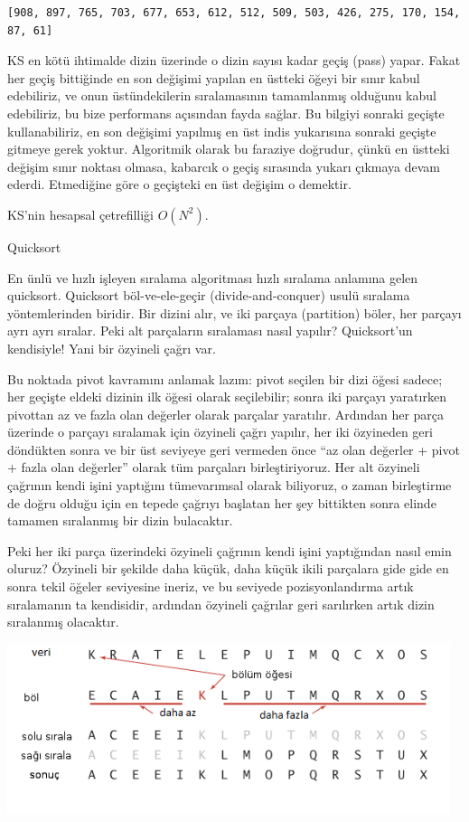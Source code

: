 \documentclass[12pt,fleqn]{article}\usepackage{../../common}
\begin{document}
\begin{verbatim}
[908, 897, 765, 703, 677, 653, 612, 512, 509, 503, 426, 275, 170, 154, 87, 61]
\end{verbatim}

KS en kötü ihtimalde dizin üzerinde o dizin sayısı kadar geçiş (pass)
yapar. Fakat her geçiş bittiğinde en son değişimi yapılan en üstteki öğeyi bir
sınır kabul edebiliriz, ve onun üstündekilerin sıralamasının tamamlanmış
olduğunu kabul edebiliriz, bu bize performans açısından fayda sağlar. Bu bilgiyi
sonraki geçişte kullanabiliriz, en son değişimi yapılmış en üst indis yukarısına
sonraki geçişte gitmeye gerek yoktur. Algoritmik olarak bu faraziye doğrudur,
çünkü en üstteki değişim sınır noktası olmasa, kabarcık o geçiş sırasında yukarı
çıkmaya devam ederdi.  Etmediğine göre o geçişteki en üst değişim o demektir.

KS'nin hesapsal çetrefilliği $O(N^2)$.

Quicksort

En ünlü ve hızlı işleyen sıralama algoritması hızlı sıralama anlamına gelen
quicksort. Quicksort böl-ve-ele-geçir (divide-and-conquer) usulü sıralama
yöntemlerinden biridir. Bir dizini alır, ve iki parçaya (partition) böler,
her parçayı ayrı ayrı sıralar. Peki alt parçaların sıralaması nasıl
yapılır? Quicksort'un kendisiyle! Yani bir özyineli çağrı var.

Bu noktada pivot kavramını anlamak lazım: pivot seçilen bir dizi öğesi sadece;
her geçişte eldeki dizinin ilk öğesi olarak seçilebilir; sonra iki parçayı
yaratırken pivottan az ve fazla olan değerler olarak parçalar
yaratılır. Ardından her parça üzerinde o parçayı sıralamak için özyineli çağrı
yapılır, her iki özyineden geri döndükten sonra ve bir üst seviyeye geri
vermeden önce ``az olan değerler + pivot + fazla olan değerler'' olarak tüm
parçaları birleştiriyoruz. Her alt özyineli çağrının kendi işini yaptığını
tümevarımsal olarak biliyoruz, o zaman birleştirme de doğru olduğu için en
tepede çağrıyı başlatan her şey bittikten sonra elinde tamamen sıralanmış bir
dizin bulacaktır.

Peki her iki parça üzerindeki özyineli çağrının kendi işini yaptığından nasıl
emin oluruz? Özyineli bir şekilde daha küçük, daha küçük ikili parçalara gide
gide en sonra tekil öğeler seviyesine ineriz, ve bu seviyede pozisyonlandırma
artık sıralamanın ta kendisidir, ardından özyineli çağrılar geri sarılırken
artık dizin sıralanmış olacaktır.

\includegraphics[height=5cm]{sort_01.png}
\end{document}
